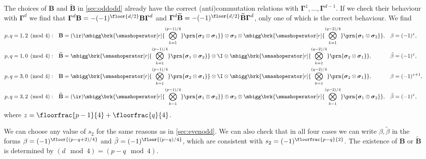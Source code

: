 \documentclass[11pt]{article}
\newcommand{\Gammab}{\boldsymbol{\Gamma}}
\newcommand{\B}{\mathbf{B}}
\newcommand{\Bt}{\widetilde{\B}}
\newcommand{\sigmab}{\boldsymbol{\sigma}}
\newcommand{\betat}{\tilde{\beta}}
\begin{document}
The choices of \(\B\) and \(\Bt\) in \cref{sec:oddodd} already have the correct (anti)commutation relations with \(\Gammab^1, \ldots, \Gammab^{d-1}\).
If we check their behaviour with \(\Gammab^d\) we find that \(\Gammab^d \B = -(-1)^{\floor{d/2}}\B \Gammab^d\) and \(\Gammab^d \Bt = -(-1)^{\floor{d/2}}\Bt \Gammab^d\), only one of which is the correct behaviour.
We find
%
\begin{equation*}
\begin{aligned}
  p, q &= 1, 2 \pmod 4: &
  \B &= (\ir)
        \mbigg\brk{\smashoperator[r]{\bigotimes_{k=1}^{(p-1)/4}}
        \prn{\sigmab_2 \otimes \sigmab_1}} \otimes
        \sigmab_3 \otimes
        \mbigg\brk{\smashoperator[r]{\bigotimes_{k=1}^{(q-2)/4}}
        \prn{\sigmab_1 \otimes \sigmab_2}}, &
  \beta &= (-1)^{z}, \\
  p, q &= 1, 0 \pmod 4: &
  \Bt &=
        \mbigg\brk{\smashoperator[r]{\bigotimes_{k=1}^{(p-1)/4}}
        \prn{\sigmab_1 \otimes \sigmab_2}} \otimes
        \I \otimes
        \mbigg\brk{\smashoperator[r]{\bigotimes_{k=1}^{(q-2)/4}}
        \prn{\sigmab_2 \otimes \sigmab_1}}, &
  \betat &= (-1)^{z}, \\
  p, q &= 3, 0 \pmod 4: &
  \B &=
        \mbigg\brk{\smashoperator[r]{\bigotimes_{k=1}^{(p-1)/4}}
        \prn{\sigmab_2 \otimes \sigmab_1}} \otimes
        \I \otimes
        \mbigg\brk{\smashoperator[r]{\bigotimes_{k=1}^{(q-2)/4}}
        \prn{\sigmab_2 \otimes \sigmab_1}}, &
  \beta &= (-1)^{z+1}, \\
  p, q &= 3, 2 \pmod 4: &
  \Bt &= (\ir)
        \mbigg\brk{\smashoperator[r]{\bigotimes_{k=1}^{(p-1)/4}}
        \prn{\sigmab_1 \otimes \sigmab_2}} \otimes
        \sigmab_3 \otimes
        \mbigg\brk{\smashoperator[r]{\bigotimes_{k=1}^{(q-2)/4}}
        \prn{\sigmab_1 \otimes \sigmab_2}}, &
  \betat &= (-1)^{z}, \\
\end{aligned}
\end{equation*}
%
where \(z = \floorfrac{p-1}{4} + \floorfrac{q}{4}\).

We can choose any value of \(s_2\) for the same reasons as in \cref{sec:evenodd}.
We can also check that in all four cases we can write \(\beta, \betat\) in the forms \(\beta = (-1)^{\floor{(p-q+2)/4}}\) and \(\betat = (-1)^{\floor{(p-q)/4}}\), 
which are consistent with \(s_2 = (-1)^{\floorfrac{p-q}{2}}\).
The existence of \(\B\) or \(\Bt\) is determined by \((d \mod 4) = (p-q \mod 4)\).
\end{document}
